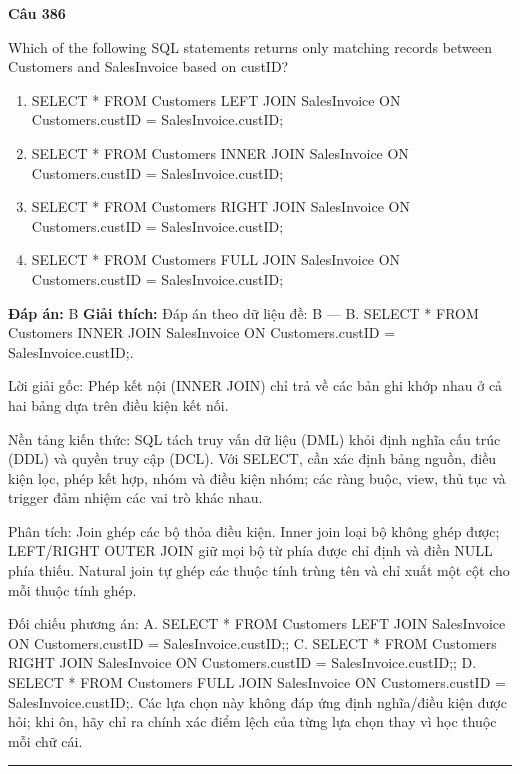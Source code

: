 \documentclass[11pt,a4paper]{article}
\newenvironment{question}[1]{%
  \par\vspace{1em}\noindent\textbf{\large Câu #1}\par\vspace{0.4em}
}{%
  \par\vspace{1em}\hrule\vspace{0.6em}
}
\newenvironment{choices}{%
  \begin{enumerate}[label=\textbf{\Alph*.},leftmargin=2.2em,itemsep=2pt,topsep=3pt]
}{%
  \end{enumerate}
}
\newcommand{\choice}{\item}
\begin{document}
\begin{question}{386}
Which of the following SQL statements returns only matching records between Customers and SalesInvoice based on custID?
\begin{choices}
\choice SELECT * FROM Customers LEFT JOIN SalesInvoice ON Customers.custID = SalesInvoice.custID;
\choice SELECT * FROM Customers INNER JOIN SalesInvoice ON Customers.custID = SalesInvoice.custID;
\choice SELECT * FROM Customers RIGHT JOIN SalesInvoice ON Customers.custID = SalesInvoice.custID;
\choice SELECT * FROM Customers FULL JOIN SalesInvoice ON Customers.custID = SalesInvoice.custID;
\end{choices}
\textbf{Đáp án:} B
\textbf{Giải thích:} Đáp án theo dữ liệu đề: B — B. SELECT * FROM Customers INNER JOIN SalesInvoice ON Customers.custID = SalesInvoice.custID;.

Lời giải gốc: Phép kết nội (INNER JOIN) chỉ trả về các bản ghi khớp nhau ở cả hai bảng dựa trên điều kiện kết nối.

Nền tảng kiến thức: SQL tách truy vấn dữ liệu (DML) khỏi định nghĩa cấu trúc (DDL) và quyền truy cập (DCL). Với SELECT, cần xác định bảng nguồn, điều kiện lọc, phép kết hợp, nhóm và điều kiện nhóm; các ràng buộc, view, thủ tục và trigger đảm nhiệm các vai trò khác nhau.

Phân tích: Join ghép các bộ thỏa điều kiện. Inner join loại bộ không ghép được; LEFT/RIGHT OUTER JOIN giữ mọi bộ từ phía được chỉ định và điền NULL phía thiếu. Natural join tự ghép các thuộc tính trùng tên và chỉ xuất một cột cho mỗi thuộc tính ghép.

Đối chiếu phương án: A. SELECT * FROM Customers LEFT JOIN SalesInvoice ON Customers.custID = SalesInvoice.custID;; C. SELECT * FROM Customers RIGHT JOIN SalesInvoice ON Customers.custID = SalesInvoice.custID;; D. SELECT * FROM Customers FULL JOIN SalesInvoice ON Customers.custID = SalesInvoice.custID;. Các lựa chọn này không đáp ứng định nghĩa/điều kiện được hỏi; khi ôn, hãy chỉ ra chính xác điểm lệch của từng lựa chọn thay vì học thuộc mỗi chữ cái.
\end{question}
\end{document}
